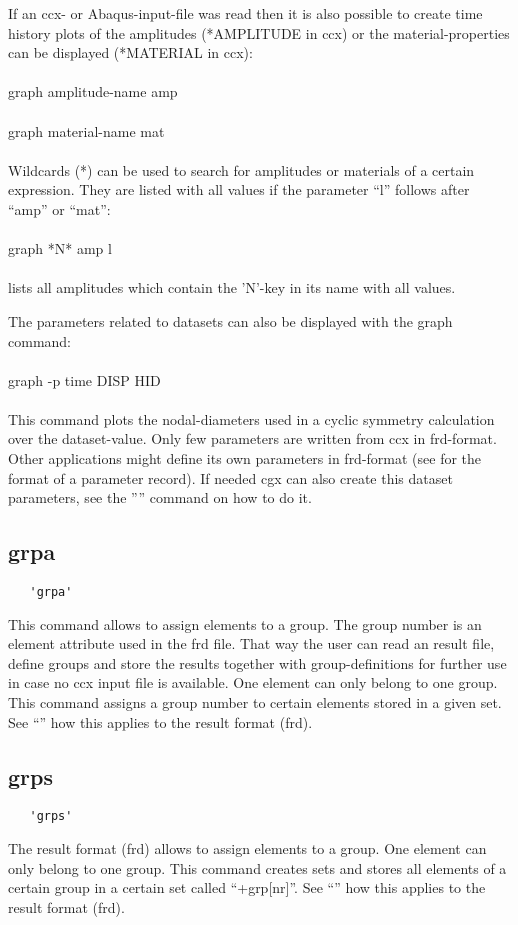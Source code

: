 \documentclass{article}
\begin{document}
If an ccx- or Abaqus-input-file was read then it is also possible to create time history plots of the amplitudes (*AMPLITUDE in ccx) or the material-properties can be displayed (*MATERIAL in ccx):\\\\graph amplitude-name amp\\\\graph material-name mat\\\\Wildcards (*) can be used to search for amplitudes or materials of a certain expression. They are listed with all values if the parameter ``l'' follows after ``amp'' or ``mat'':\\\\graph *N* amp l\\\\lists all amplitudes which contain the 'N'-key in its name with all values.

The parameters related to datasets can also be displayed with the graph command:\\\\graph -p time DISP HID\\\\This command plots the nodal-diameters used in a cyclic symmetry calculation over the dataset-value. Only few parameters are written from ccx in frd-format. Other applications might define its own parameters in frd-format (see  for the format of a parameter record). If needed cgx can also create this dataset parameters, see the '''' command on how to do it. 

\subsection{\label{grpa}grpa}
\begin{verbatim}
   'grpa'
\end{verbatim}
This command allows to assign elements to a group. The group number is an element attribute used in the frd file. That way the user can read an result file, define groups and store the results together with group-definitions for further use in case no ccx input file is available. One element can only belong to one group. This command assigns a group number to certain elements stored in a given set. See ``'' how this applies to the result format (frd).

\subsection{\label{grps}grps}
\begin{verbatim}
   'grps'
\end{verbatim}
The result format (frd) allows to assign elements to a group. One element can only belong to one group. This command creates sets and stores all elements of a certain group in a certain set called ``+grp[nr]''. See ``'' how this applies to the result format (frd).
\end{document}
